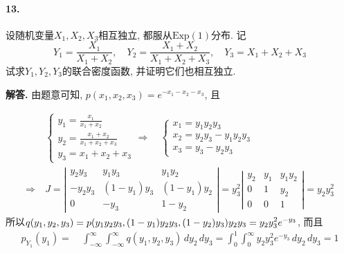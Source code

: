\documentclass[12pt, a4paper, oneside]{ctexart}
\newenvironment{solution}{\par\noindent\textbf{解答. }}{\bigskip\par}
\begin{document}
\paragraph{13.}设随机变量$X_1,X_2,X_3$相互独立, 都服从$\text{Exp}(1)$分布. 记
\begin{equation*}
    Y_1=\frac{X_1}{X_1+X_2},\quad Y_2=\frac{X_1+X_2}{X_1+X_2+X_3},\quad Y_3=X_1+X_2+X_3
\end{equation*}
试求$Y_1,Y_2,Y_3$的联合密度函数, 并证明它们也相互独立.
\begin{solution}
    由题意可知, $p(x_1,x_2,x_3) = e^{-x_1-x_2-x_3}$, 且

    \begin{equation*}
        \begin{aligned}
            &\ \begin{cases}
                y_1=\frac{x_1}{x_1+x_2}\\
                y_2=\frac{x_1+x_2}{x_1+x_2+x_3}\\
                y_3=x_1+x_2+x_3
            \end{cases}\Rightarrow\quad
            \begin{cases}
                x_1=y_1y_2y_3\\
                x_2=y_2y_3-y_1y_2y_3\\
                x_3=y_3-y_2y_3
            \end{cases}\\
            \Rightarrow&\ J = \left|\begin{matrix}
                y_2y_3&y_1y_3&y_1y_2\\
                -y_2y_3&(1-y_1)y_3&(1-y_1)y_2\\
                0&-y_3&1-y_2
            \end{matrix}\right| = y_3^2\left|\begin{matrix}
                y_2&y_1&y_1y_2\\
                0&1&y_2\\
                0&0&1
            \end{matrix}\right| = y_2y_3^2
        \end{aligned}
    \end{equation*}
    所以$\displaystyle q(y_1,y_2,y_3) = p(y_1y_2y_3,(1-y_1)y_2y_3,(1-y_2)y_3)y_2y_3 = y_2y_3^2e^{-y_3}$, 而且
    \begin{equation*}
        \begin{aligned}
            p_{Y_1}(y_1) =&\ \int_{-\infty}^{\infty}\int_{-\infty}^{\infty}q(y_1, y_2,y_3)\,dy_2\,dy_3 = \int_0^1\int_{0}^{\infty}y_2y_3^2e^{-y_3}\,dy_2\,dy_3 = 1\\

\end{aligned}
\end{equation*}
\end{solution}
\end{document}
